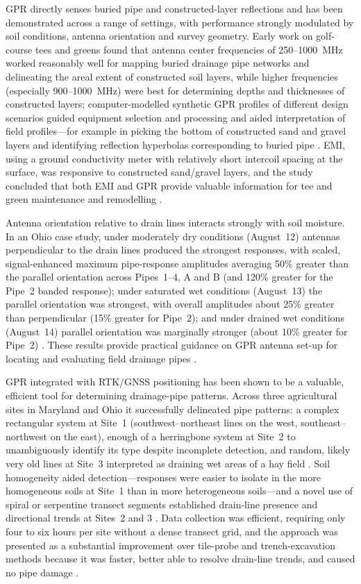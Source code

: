 \documentclass[11pt]{article}
\begin{document}
GPR directly senses buried pipe and constructed-layer reflections and has been demonstrated across a range of settings, with performance strongly modulated by soil conditions, antenna orientation and survey geometry. Early work on golf-course tees and greens found that antenna center frequencies of 250--1000~MHz worked reasonably well for mapping buried drainage pipe networks and delineating the areal extent of constructed soil layers, while higher frequencies (especially 900--1000~MHz) were best for determining depths and thicknesses of constructed layers; computer-modelled synthetic GPR profiles of different design scenarios guided equipment selection and processing and aided interpretation of field profiles---for example in picking the bottom of constructed sand and gravel layers and identifying reflection hyperbolas corresponding to buried pipe \parencite{Allred2005}. EMI, using a ground conductivity meter with relatively short intercoil spacing at the surface, was responsive to constructed sand/gravel layers, and the study concluded that both EMI and GPR provide valuable information for tee and green maintenance and remodelling \parencite{Allred2005}.

Antenna orientation relative to drain lines interacts strongly with soil moisture. In an Ohio case study, under moderately dry conditions (August~12) antennas perpendicular to the drain lines produced the strongest responses, with scaled, signal-enhanced maximum pipe-response amplitudes averaging 50\% greater than the parallel orientation across Pipes~1--4, A and B (and 120\% greater for the Pipe~2 banded response); under saturated wet conditions (August~13) the parallel orientation was strongest, with overall amplitudes about 25\% greater than perpendicular (15\% greater for Pipe~2); and under drained wet conditions (August~14) parallel orientation was marginally stronger (about 10\% greater for Pipe~2) \parencite{Allred2013}. These results provide practical guidance on GPR antenna set-up for locating and evaluating field drainage pipes \parencite{Allred2013}.

GPR integrated with RTK/GNSS positioning has been shown to be a valuable, efficient tool for determining drainage-pipe patterns. Across three agricultural sites in Maryland and Ohio it successfully delineated pipe patterns: a complex rectangular system at Site~1 (southwest--northeast lines on the west, southeast--northwest on the east), enough of a herringbone system at Site~2 to unambiguously identify its type despite incomplete detection, and random, likely very old lines at Site~3 interpreted as draining wet areas of a hay field \parencite{Allred2018b}. Soil homogeneity aided detection---responses were easier to isolate in the more homogeneous soils at Site~1 than in more heterogeneous soils---and a novel use of spiral or serpentine transect segments established drain-line presence and directional trends at Sites~2 and 3 \parencite{Allred2018b}. Data collection was efficient, requiring only four to six hours per site without a dense transect grid, and the approach was presented as a substantial improvement over tile-probe and trench-excavation methods because it was faster, better able to resolve drain-line trends, and caused no pipe damage \parencite{Allred2018b}.
\end{document}
